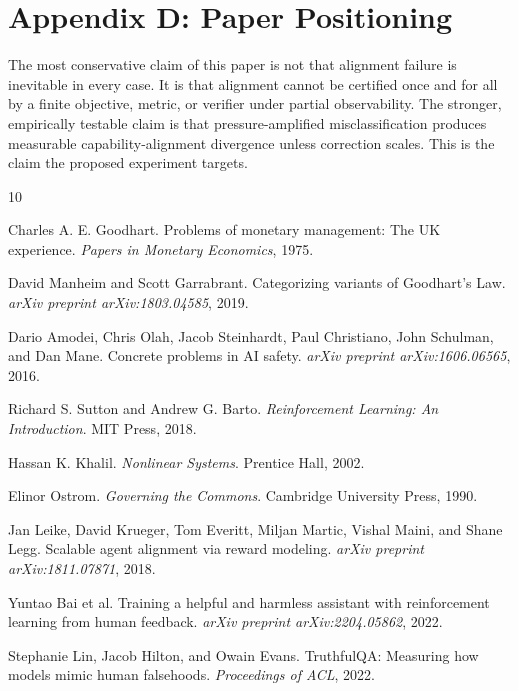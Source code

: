 \documentclass[11pt]{article}
\begin{document}
\section{Appendix D: Paper Positioning}

The most conservative claim of this paper is not that alignment failure is inevitable in every case. It is that alignment cannot be certified once and for all by a finite objective, metric, or verifier under partial observability. The stronger, empirically testable claim is that pressure-amplified misclassification produces measurable capability-alignment divergence unless correction scales. This is the claim the proposed experiment targets.


\begin{thebibliography}{10}

Charles A. E. Goodhart.
\newblock Problems of monetary management: The UK experience.
\newblock \emph{Papers in Monetary Economics}, 1975.

David Manheim and Scott Garrabrant.
\newblock Categorizing variants of Goodhart's Law.
\newblock \emph{arXiv preprint arXiv:1803.04585}, 2019.

Dario Amodei, Chris Olah, Jacob Steinhardt, Paul Christiano, John Schulman, and Dan Mane.
\newblock Concrete problems in AI safety.
\newblock \emph{arXiv preprint arXiv:1606.06565}, 2016.

Richard S. Sutton and Andrew G. Barto.
\newblock \emph{Reinforcement Learning: An Introduction}.
\newblock MIT Press, 2018.

Hassan K. Khalil.
\newblock \emph{Nonlinear Systems}.
\newblock Prentice Hall, 2002.

Elinor Ostrom.
\newblock \emph{Governing the Commons}.
\newblock Cambridge University Press, 1990.

Jan Leike, David Krueger, Tom Everitt, Miljan Martic, Vishal Maini, and Shane Legg.
\newblock Scalable agent alignment via reward modeling.
\newblock \emph{arXiv preprint arXiv:1811.07871}, 2018.

Yuntao Bai et al.
\newblock Training a helpful and harmless assistant with reinforcement learning from human feedback.
\newblock \emph{arXiv preprint arXiv:2204.05862}, 2022.

Stephanie Lin, Jacob Hilton, and Owain Evans.
\newblock TruthfulQA: Measuring how models mimic human falsehoods.
\newblock \emph{Proceedings of ACL}, 2022.

\end{thebibliography}
\end{document}
